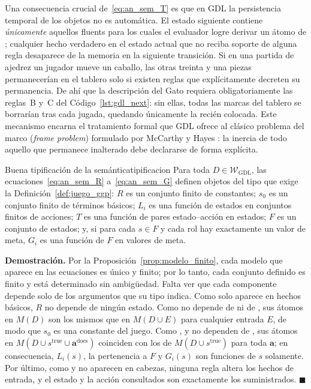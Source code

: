 Una consecuencia crucial de~\eqref{eq:an_sem_T} es que en GDL la persistencia temporal de los objetos no es automática. El estado siguiente contiene \emph{únicamente} aquellos fluents para los cuales el evaluador logre derivar un átomo de ; cualquier hecho verdadero en el estado actual que no reciba soporte de alguna regla desaparece de la memoria en la siguiente transición. Si en una partida de ajedrez un jugador mueve un caballo, las otras treinta y una piezas permanecerían en el tablero solo si existen reglas que explícitamente decreten su permanencia. De ahí que la descripción del Gato requiera obligatoriamente las reglas~B y~C del Código~\ref{lst:gdl_next}: sin ellas, todas las marcas del tablero se borrarían tras cada jugada, quedando únicamente la recién colocada. Este mecanismo encarna el tratamiento formal que GDL ofrece al clásico problema del marco (\emph{frame problem}) formulado por McCarthy y Hayes \cite{McCarthyHayes1969}: la inercia de todo aquello que permanece inalterado debe declararse de forma explícita.

\begin{proposicion}{Buena tipificación de la semántica}{tipificacion}
Para toda $D \in \mathcal W_{\mathrm{GDL}}$, las ecuaciones~\eqref{eq:an_sem_R} a~\eqref{eq:an_sem_G} definen objetos del tipo que exige la Definición~\ref{def:juego_ggp}: $R$ es un conjunto finito de constantes; $s_0$ es un conjunto finito de términos básicos; $L_i$ es una función de estados en conjuntos finitos de acciones; $T$ es una función de pares estado--acción en estados; $F$ es un conjunto de estados; y, si para cada $s \in F$ y cada rol hay exactamente un valor de meta, $G_i$ es una función de $F$ en valores de meta.
\end{proposicion}

\noindent\textbf{Demostración.} Por la Proposición~\ref{prop:modelo_finito}, cada modelo que aparece en las ecuaciones es único y finito; por lo tanto, cada conjunto definido es finito y está determinado sin ambigüedad. Falta ver que cada componente depende solo de los argumentos que su tipo indica. Como  solo aparece en hechos básicos, $R$ no depende de ningún estado. Como  no depende de  ni de , sus átomos en $M(D)$ son los mismos que en $M(D \cup E)$ para cualquier entrada $E$, de modo que $s_0$ es una constante del juego. Como ,  y  no dependen de , sus átomos en $M(D \cup s^{\mathrm{true}} \cup \mathbf a^{\mathrm{does}})$ coinciden con los de $M(D \cup s^{\mathrm{true}})$ para toda $\mathbf a$; en consecuencia, $L_i(s)$, la pertenencia a $F$ y $G_i(s)$ son funciones de $s$ solamente. Por último, como  y  no aparecen en cabezas, ninguna regla altera los hechos de entrada, y el estado y la acción consultados son exactamente los suministrados. \hfill $\blacksquare$

